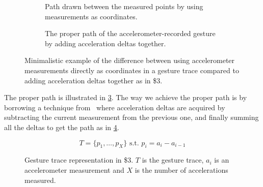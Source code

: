 \begin{figure}[h]
    \begin{subfigure}{.5\linewidth}
    \caption{Path drawn between the measured points by using measurements as coordinates.}
\label{fig:accelerometerpath}
    \end{subfigure}
    \begin{subfigure}{.5\linewidth}
    \caption{The proper path of the accelerometer-recorded gesture by adding acceleration deltas together.}
\label{fig:acceleromterpath-proper}
    \end{subfigure}
\caption{Minimalistic example of the difference between using accelerometer measurements directly as coordinates in a gesture trace compared to adding acceleration deltas together as in \$3.}
\end{figure}

The proper path is illustrated in \cref{fig:acceleromterpath-proper}.
The way we achieve the proper path is by borrowing a technique from~\cite{threedollar} where acceleration deltas are acquired by subtracting the current measurement from the previous one, and finally summing all the deltas to get the path as in \cref{eq:acceleration-timeseries-duplicate}.

\begin{figure}[h]
\[ T = \{p_1,\ldots,p_X\} \text{ s.t. } p_i=a_i-a_{i-1} \]
\caption{Gesture trace representation in \$3. $T$ is the gesture trace, $a_i$ is an accelerometer measurement and $X$ is the number of accelerations measured.}
\label{eq:acceleration-timeseries-duplicate}
\end{figure}